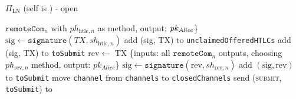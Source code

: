 \begin{protocolbox}{$\Pi_{\mathrm{LN}}$ (self is \alice) - open}
\begin{algorithmic}[1]
            $\mathtt{remoteCom}_n$ with $ph_{\mathrm{htlc}, n}$ as method,
            output: $pk_{\mathit{Alice}}$\}
            \State $\mathrm{sig} \gets \mathtt{signature}\left(TX,
            sh_{\mathrm{htlc}, n}\right)$
              \State add (sig, TX) to \texttt{unclaimedOfferedHTLCs}
              \State add (sig, TX) to \texttt{toSubmit}
            \EndIf
          \EndFor
        \Else {}
          \State $\mathrm{rev} \gets$ TX \{inputs: all $\mathtt{remoteCom}_n$
          outputs, choosing $ph_{\mathrm{rev}, n}$ method, output:
          $pk_{\mathit{Alice}}$\}
          \State $\mathrm{sig} \gets \mathtt{signature}\left(\mathrm{rev},
          sh_{\mathrm{rev}, n}\right)$
          \State add $\left(\mathrm{sig}, \mathrm{rev}\right)$ to
          \texttt{toSubmit}
        \EndIf
        \State move \texttt{channel} from \texttt{channels} to
        \texttt{closedChannels}
      \EndFor
      \State send (\textsc{submit}, \texttt{toSubmit}) to \ledger
    \EndIndent
    \State
  \end{algorithmic}
\end{protocolbox}

